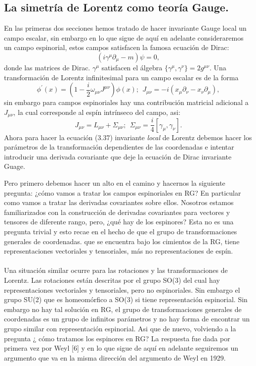 \subsection{La simetría de Lorentz como teoría Gauge.}
En las primeras dos secciones hemos tratado de hacer invariante Gauge local un campo escalar, sin embargo en lo que sigue de aquí en adelante consideraremos un campo espinorial, estos campos satisfacen la famosa ecuación de Dirac:
\begin{equation}
(i\gamma^\mu\partial_\mu-m)\psi=0,
\end{equation}		
donde las matrices de Dirac. $\gamma^\mu$ satisfacen el álgebra $\{\gamma^\mu,\gamma^\nu\}=2g^{\mu\nu}$. Una transformación de Lorentz infinitesimal para un campo escalar es de la forma 
\begin{equation}
\phi^\prime(x)=\left(1-\frac{i}{2}\omega_{\mu\nu}J^{\mu\nu}\right)\phi(x);\ \ J_{\mu\nu}=-i(x_\mu\partial_\nu-x_\nu\partial_\mu) ,
\end{equation} 
sin embargo para campos espinoriales hay una contribución matricial adicional a $J_{\mu\nu}$, la cual corresponde al espín intrínseco del campo, asi:
\begin{equation}
J_{\mu\nu}=L_{\mu\nu}+\Sigma_{\mu\nu};\ \ \Sigma_{\mu\nu}=\frac{i}{4}[\gamma_\mu,\gamma_\nu] .
\end{equation}
Ahora para hacer la ecuación (3.37) invariante \textit{local} de Lorentz debemos hacer los parámetros de la transformación dependientes de las coordenadas e intentar introducir una derivada covariante que deje la ecuación de Dirac invariante Guage.

Pero primero debemos hacer un alto en el camino y hacernos la siguiente pregunta: ¿cómo vamos a tratar los campos espinoriales en RG? En particular como vamos a tratar las derivadas covariantes sobre ellos. Nosotros estamos familiarizados con la construcción de derivadas covariantes para vectores y tensores de diferente rango, pero, ¿qué hay de los espinores? Esta no es una pregunta trivial y esto recae en el hecho de que el grupo de transformaciones generales de coordenadas. que se encuentra bajo los cimientos de la RG, tiene representaciones vectoriales y tensoriales, más no representaciones de espín.
\\
\\
Una situación similar ocurre para las rotaciones y las transformaciones de Lorentz. Las rotaciones están descritas por el grupo SO(3) del cual hay representaciones vectoriales y tensoriales, pero no espinoriales. Sin embargo el grupo SU(2) que es homeomórfico a SO(3) si tiene representación espinorial. Sin embargo no hay tal solución en RG, el grupo de transformaciones generales de coordenadas es un grupo de infinitos parámetros y no hay forma de encontrar un grupo similar con representación espinorial. Asi que de nuevo, volviendo a la pregunta ¿ cómo tratamos los espinores en RG? La respuesta fue dada por primera vez por Weyl [6] y en lo que sigue de aquí en adelante seguiremos un argumento que va en la misma dirección del argumento de Weyl en 1929. 

